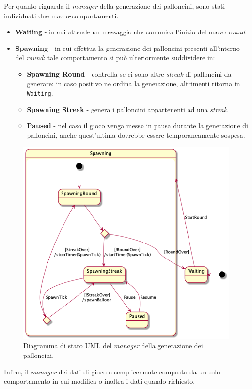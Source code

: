 Per quanto riguarda il \textit{manager} della generazione dei palloncini, sono stati individuati due
macro-comportamenti:
\begin{itemize}
    \item \textbf{Waiting} - in cui attende un messaggio che comunica l'inizio del nuovo \textit{round}.
    \item \textbf{Spawning} - in cui effettua la generazione dei palloncini presenti all'interno del \textit{round}:
    tale comportamento si può ulteriormente suddividere in:
    \begin{itemize}
        \item \textbf{Spawning Round} - controlla se ci sono altre \textit{streak} di palloncini da generare: in caso
        positivo ne ordina la generazione, altrimenti ritorna in \texttt{Waiting}.
        \item \textbf{Spawning Streak} - genera i palloncini appartenenti ad una \textit{streak}.
        \item \textbf{Paused} - nel caso il gioco venga messo in pausa durante la generazione di palloncini, anche
        quest'ultima dovrebbe essere temporaneamente sospesa.
    \end{itemize}
\end{itemize}

\begin{figure}[H]
    \centering
    \includegraphics[width=.8\linewidth]{img/state-spawn-manager}
    \caption{Diagramma di stato UML del \textit{manager} della generazione dei palloncini.}
    \label{fig:spawn-manager}
\end{figure}

Infine, il \textit{manager} dei dati di gioco è semplicemente composto da un solo comportamento in cui modifica o
inoltra i dati quando richiesto.